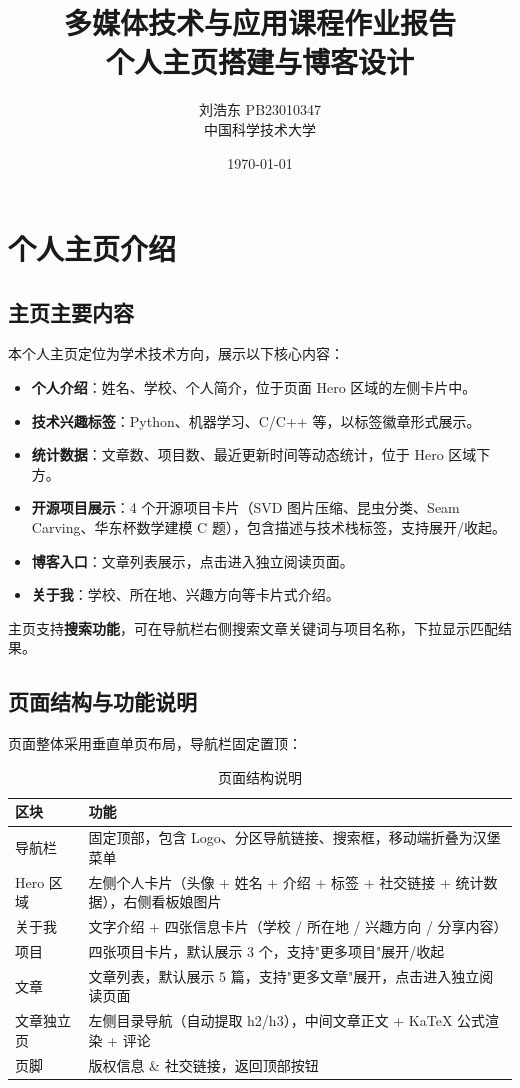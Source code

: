 \documentclass[12pt, a4paper]{article}
\title{\textbf{多媒体技术与应用课程作业报告}\\[4pt]\large 个人主页搭建与博客设计}
\author{刘浩东 \quad PB23010347 \\ 中国科学技术大学}
\date{\today}
\begin{document}
\maketitle

\section{个人主页介绍}

\subsection{主页主要内容}

本个人主页定位为学术技术方向，展示以下核心内容：

\begin{itemize}[leftmargin=*]
    \item \textbf{个人介绍}：姓名、学校、个人简介，位于页面 Hero 区域的左侧卡片中。
    \item \textbf{技术兴趣标签}：Python、机器学习、C/C++ 等，以标签徽章形式展示。
    \item \textbf{统计数据}：文章数、项目数、最近更新时间等动态统计，位于 Hero 区域下方。
    \item \textbf{开源项目展示}：4 个开源项目卡片（SVD 图片压缩、昆虫分类、Seam Carving、华东杯数学建模 C 题），包含描述与技术栈标签，支持展开/收起。
    \item \textbf{博客入口}：文章列表展示，点击进入独立阅读页面。
    \item \textbf{关于我}：学校、所在地、兴趣方向等卡片式介绍。
\end{itemize}

主页支持\textbf{搜索功能}，可在导航栏右侧搜索文章关键词与项目名称，下拉显示匹配结果。

\subsection{页面结构与功能说明}

页面整体采用垂直单页布局，导航栏固定置顶：

\begin{table}[H]
\centering
\caption{页面结构说明}
\begin{tabular}{p{3cm}p{9cm}}
\toprule
\textbf{区块} & \textbf{功能} \\
\midrule
导航栏 & 固定顶部，包含 Logo、分区导航链接、搜索框，移动端折叠为汉堡菜单 \\
Hero 区域 & 左侧个人卡片（头像 + 姓名 + 介绍 + 标签 + 社交链接 + 统计数据），右侧看板娘图片 \\
关于我 & 文字介绍 + 四张信息卡片（学校 / 所在地 / 兴趣方向 / 分享内容）\\
项目 & 四张项目卡片，默认展示 3 个，支持"更多项目"展开/收起 \\
文章 & 文章列表，默认展示 5 篇，支持"更多文章"展开，点击进入独立阅读页面 \\
文章独立页 & 左侧目录导航（自动提取 h2/h3），中间文章正文 + KaTeX 公式渲染 + 评论 \\
页脚 & 版权信息 \& 社交链接，返回顶部按钮 \\
\bottomrule
\end{tabular}
\end{table}
\end{document}

